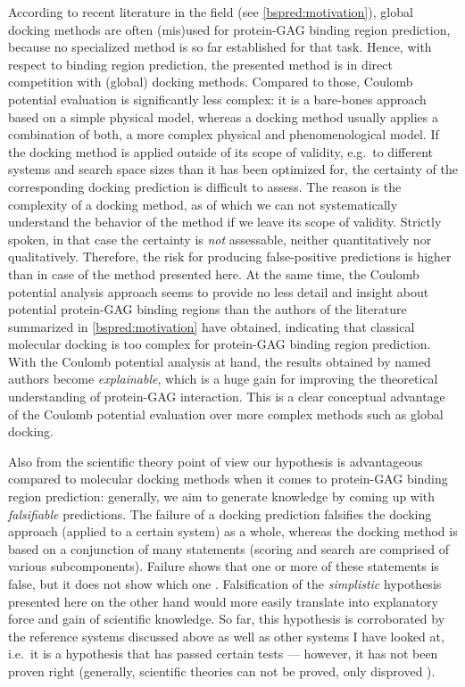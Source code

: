 According to recent literature in the field (see \cref{bspred:motivation}),
global docking methods are often (mis)used for protein-GAG binding region
prediction, because no specialized method is so far established for that task.
Hence, with respect to binding region prediction, the presented method is in
direct competition with (global) docking methods. Compared to those, Coulomb
potential evaluation is significantly less complex: it is a bare-bones approach
based on a simple physical model, whereas a docking method usually applies a
combination of both, a more complex physical and phenomenological model. If the
docking method is applied outside of its scope of validity, e.g.\ to different
systems and search space sizes than it has been optimized for, the certainty of
the corresponding docking prediction is difficult to assess. The reason is the
complexity of a docking method, as of which we can not systematically understand
the behavior of the method if we leave its scope of validity. Strictly spoken,
in that case the certainty is
\textit{not} assessable, neither quantitatively nor qualitatively. Therefore,
the risk for producing false-positive predictions is higher than in case of the
method presented here. At the same time, the Coulomb potential analysis approach
seems to provide no less detail and insight about potential protein-GAG binding
regions than the authors of the literature summarized in
\cref{bspred:motivation} have obtained, indicating that classical molecular
docking is too complex for protein-GAG binding region prediction. With the
Coulomb potential analysis at hand, the results obtained by named authors become
\textit{explainable}, which is a huge gain for improving the theoretical
understanding of protein-GAG interaction. This is a clear conceptual advantage
of the Coulomb potential evaluation over more complex methods such as global
docking.

Also from the scientific theory point of view our hypothesis is advantageous
compared to molecular docking methods when it comes to protein-GAG binding
region prediction: generally, we aim to generate knowledge by coming up with
\textit{falsifiable} predictions. The failure of a docking prediction falsifies
the docking approach (applied to a certain system) as a whole, whereas the
docking method is based on a conjunction of many statements (scoring and search
are comprised of various subcomponents). Failure shows that one or more of these
statements is false, but it does not show which one \cite{savage1990scientific}.
Falsification of the \textit{simplistic} hypothesis presented here on the other
hand would more easily translate into explanatory force and gain of scientific
knowledge. So far, this hypothesis is corroborated by the reference systems
discussed above as well as other systems I have looked at, i.e.\ it is a
hypothesis that has passed certain tests --- however, it has not been proven
right (generally, scientific theories can not be proved, only disproved
\cite{schafersman_scientific_method}).

